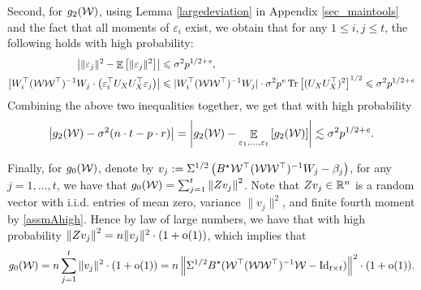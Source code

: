 	Second, for $g_2(\cW)$, using Lemma \ref{largedeviation} in Appendix \ref{sec_maintools} and the fact that all moments of $\varepsilon_i$ exist, we obtain that for any $1\le i, j \le t$, the following holds with high probability:
	\begin{align*}
		\bigabs{\norm{\varepsilon_j}^2 - \ex{\norm{\varepsilon_j}^2}} &\le \sigma^2 p^{1/2+\e},\\
		\abs{W_i^{\top} (\cW\cW^{\top})^{-1} W_j \cdot \bigbrace{\varepsilon_i^{\top} U_X U_X^{\top} \varepsilon_j}}
		&\le |W_i^{\top} (\cW\cW^{\top})^{-1}W_j| \cdot \sigma^2 p^{\e} \bigtr{(U_X U_X^{\top})^2}^{1/2} \le \sigma^2 p^{1/2+\e}
	\end{align*}
	Combining the above two inequalities together, we get that with high probability
	\begin{align}
		\left|g_2(\cal W)-\sigma^2(n\cdot t - p\cdot r)\right|=\left|g_2(\cal W)- \exarg{\varepsilon_1, \dots, \varepsilon_t} {g_2(\cal W)}\right| \lesssim \sigma^2 p^{1/2+\e}. \label{eq_est_g2}
	\end{align}

	Finally, for $g_0(\cW)$, denote by $v_j:= \Sigma^{1/2}\left(B^{\star} \cW^{\top} (\cW\cW^{\top})^{-1} W_j -  \beta_j\right)$, for any $j = 1,\dots,t$, we have that $g_0(\cal W)= \sum_{j=1}^t\left\|Z v_j \right\|^2$.
	Note that $Zv_j\in \R^n$ is a random vector with i.i.d. entries of mean zero, variance $\|v_j\|^2$, and finite fourth moment by \eqref{assmAhigh}.
	Hence by law of large numbers, we have that with high probability
	${\left\|Z v_j \right\|^2 } = { n \|v_j\|^2} \cdot (1+\oo(1))$,
	which implies that
	\begin{align}
		g_0(\cal W)=n \sum_{j=1}^t \|v_j\|^2 \cdot (1+\oo(1)) = n \bignorm{\Sigma^{1/2} B^{\star} (\cW^{\top} (\cW \cW^{\top})^{-1} \cW - \id_{t\times t})}^2 \cdot (1+\oo(1)). \label{eq_est_g0}
	\end{align}

